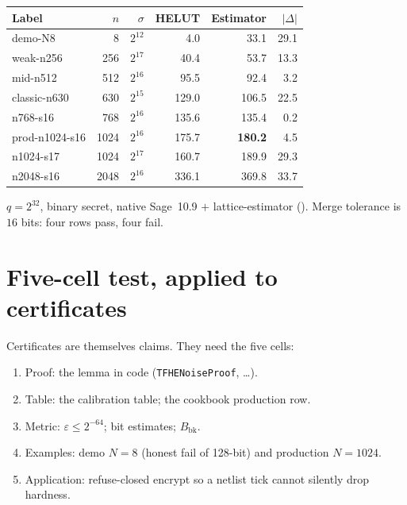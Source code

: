 \begin{center}
\small
\begin{tabular}{@{}lrrrrr@{}}
\toprule
Label & $n$ & $\sigma$ & HELUT & Estimator & $|\Delta|$ \\
\midrule
demo-N8 & 8 & $2^{12}$ & 4.0 & 33.1 & 29.1 \\
weak-n256 & 256 & $2^{17}$ & 40.4 & 53.7 & 13.3 \\
mid-n512 & 512 & $2^{16}$ & 95.5 & 92.4 & 3.2 \\
classic-n630 & 630 & $2^{15}$ & 129.0 & 106.5 & 22.5 \\
n768-s16 & 768 & $2^{16}$ & 135.6 & 135.4 & 0.2 \\
prod-n1024-s16 & 1024 & $2^{16}$ & 175.7 & \textbf{180.2} & 4.5 \\
n1024-s17 & 1024 & $2^{17}$ & 160.7 & 189.9 & 29.3 \\
n2048-s16 & 2048 & $2^{16}$ & 336.1 & 369.8 & 33.7 \\
\bottomrule
\end{tabular}
\end{center}

$q=2^{32}$, binary secret, native Sage~10.9 $+$ lattice-estimator ().
Merge tolerance is $16$ bits: four rows pass, four fail.


\section{Five-cell test, applied to certificates}

Certificates are themselves claims.
They need the five cells:

\begin{enumerate}
  \item Proof: the lemma in code (\texttt{TFHENoiseProof}, \ldots).
  \item Table: the calibration table; the cookbook production row.
  \item Metric: $\varepsilon\le 2^{-64}$; bit estimates; $B_{\mathrm{bk}}$.
  \item Examples: demo $N=8$ (honest fail of 128-bit) and production $N=1024$.
  \item Application: refuse-closed encrypt so a netlist tick cannot silently
        drop hardness.
\end{enumerate}

